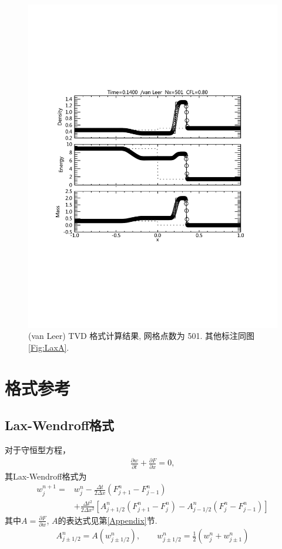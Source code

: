 \documentclass[10.5pt
]{article}
\begin{document}
\begin{figure}
\begin{center}
\includegraphics[width=.85\textwidth]{fig_tvd_2.pdf}
\caption{(van Leer) TVD 格式计算结果, 网格点数为 501. 其他标注同图\ref{Fig:LaxA}.}\label{Fig:vanLeerB}
\end{center}
\end{figure}

\section{格式参考}
\subsection{Lax-Wendroff格式}
对于守恒型方程，
\begin{align}
\frac{\partial w}{\partial t} + \frac{\partial F}{\partial x} = 0,
\end{align}
其Lax-Wendroff格式为
\begin{align}
w_j^{n+1} =& w_j^n - \frac{\Delta t}{2\Delta x} (F_{j+1}^n - F_{j-1}^n) \nonumber\\
& + \frac{\Delta t^2}{2\Delta x^2} \left[A_{j+1/2}^n (F_{j+1}^n-F_j^n) - A_{j-1/2}^n (F_j^n -
F_{j-1}^n)\right]
\end{align}
其中$A = \frac{\partial F}{\partial w}$, $A$的表达式见第\ref{Appendix}节.
\begin{align}
A_{j \pm 1/2}^n = A(w_{j \pm 1/2}^n), \qquad w_{j \pm 1/2}^n = \frac{1}{2} (w_j^n + w_{j \pm 1}^n)
\end{align}
\end{document}
